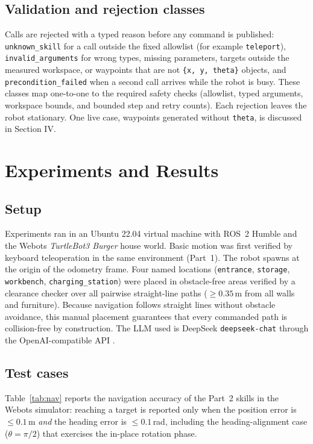 \documentclass[conference]{IEEEtran}
\begin{document}
\subsection{Validation and rejection classes}
Calls are rejected with a typed reason before any command is published:
\texttt{unknown\_skill} for a call outside the fixed allowlist (for example
\texttt{teleport}), \texttt{invalid\_arguments} for wrong types, missing
parameters, targets outside the measured workspace, or waypoints that are not
\texttt{\{x, y, theta\}} objects, and \texttt{precondition\_failed} when a
second call arrives while the robot is busy. These classes map one-to-one to
the required safety checks (allowlist, typed arguments, workspace bounds, and
bounded step and retry counts). Each rejection leaves the robot stationary.
One live case, waypoints generated without \texttt{theta}, is discussed in
Section IV.

\section{Experiments and Results}

\subsection{Setup}
Experiments ran in an Ubuntu 22.04 virtual machine with ROS~2 Humble and the
Webots \emph{TurtleBot3 Burger} house world. Basic motion was first verified
by keyboard teleoperation in the same environment (Part~1). The robot spawns
at the origin of the odometry frame. Four named locations
(\texttt{entrance}, \texttt{storage}, \texttt{workbench},
\texttt{charging\_station}) were placed in obstacle-free areas verified by a
clearance checker over all pairwise straight-line paths
($\ge 0.35$\,m from all walls and furniture). Because navigation follows
straight lines without obstacle avoidance, this manual placement guarantees
that every commanded path is collision-free by construction. The LLM used is
DeepSeek \texttt{deepseek-chat} \cite{deepseek} through the OpenAI-compatible
API \cite{openai-fc}.

\subsection{Test cases}
Table~\ref{tab:nav} reports the navigation accuracy of the Part~2 skills in the
Webots simulator: reaching a target is reported only when the position error is
$\le 0.1$\,m \emph{and} the heading error is $\le 0.1$\,rad, including the
heading-alignment case ($\theta = \pi/2$) that exercises the in-place
rotation phase.
\end{document}
